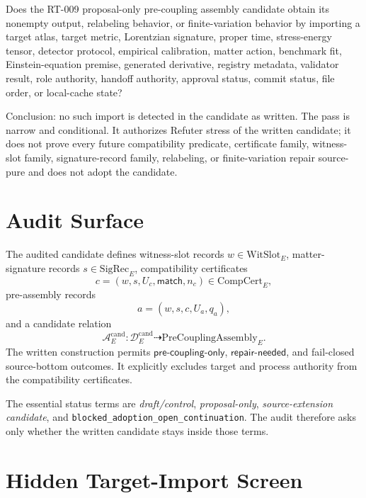 \documentclass[11pt]{article}
\newcommand{\PreCoupAsm}{\mathrm{PreCouplingAssembly}}
\newcommand{\WitSlot}{\mathrm{WitSlot}}
\newcommand{\SigRec}{\mathrm{SigRec}}
\newcommand{\CompCert}{\mathrm{CompCert}}
\begin{document}
Does the RT-009 proposal-only pre-coupling assembly candidate obtain its
nonempty output, relabeling behavior, or finite-variation behavior by
importing a target atlas, target metric, Lorentzian signature, proper time,
stress-energy tensor, detector protocol, empirical calibration, matter
action, benchmark fit, Einstein-equation premise, generated derivative,
registry metadata, validator result, role authority, handoff authority,
approval status, commit status, file order, or local-cache state?

Conclusion: no such import is detected in the candidate as written. The pass
is narrow and conditional. It authorizes Refuter stress of the written
candidate; it does not prove every future compatibility predicate,
certificate family, witness-slot family, signature-record family, relabeling,
or finite-variation repair source-pure and does not adopt the candidate.

\section{Audit Surface}

The audited candidate defines witness-slot records \(w\in\WitSlot_E\),
matter-signature records \(s\in\SigRec_E\), compatibility certificates
\[
  c=(w,s,U_c,\mathsf{match},n_c)\in\CompCert_E,
\]
pre-assembly records
\[
  a=(w,s,c,U_a,q_a),
\]
and a candidate relation
\[
  \mathcal{A}^{\mathrm{cand}}_E:
  \mathcal{D}^{\mathrm{cand}}_E \dashrightarrow \PreCoupAsm_E.
\]
The written construction permits \(\mathsf{pre\text{-}coupling\text{-}only}\),
\(\mathsf{repair\text{-}needed}\), and fail-closed source-bottom outcomes.
It explicitly excludes target and process authority from the compatibility
certificates.

The essential status terms are \emph{draft/control}, \emph{proposal-only},
\emph{source-extension candidate}, and
\texttt{blocked\_adoption\_open\_continuation}. The audit therefore asks only
whether the written candidate stays inside those terms.

\section{Hidden Target-Import Screen}
\end{document}
